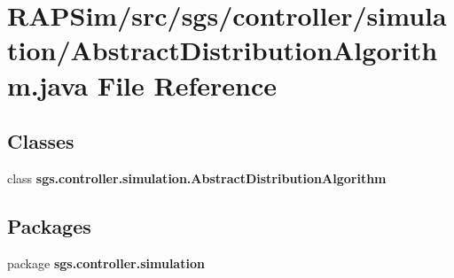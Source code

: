 \section{R\-A\-P\-Sim/src/sgs/controller/simulation/\-Abstract\-Distribution\-Algorithm.java File Reference}
\label{_abstract_distribution_algorithm_8java}
\subsection*{Classes}
\begin{DoxyCompactItemize}
\item 
class {\bf sgs.\-controller.\-simulation.\-Abstract\-Distribution\-Algorithm}
\end{DoxyCompactItemize}
\subsection*{Packages}
\begin{DoxyCompactItemize}
\item 
package {\bf sgs.\-controller.\-simulation}
\end{DoxyCompactItemize}
